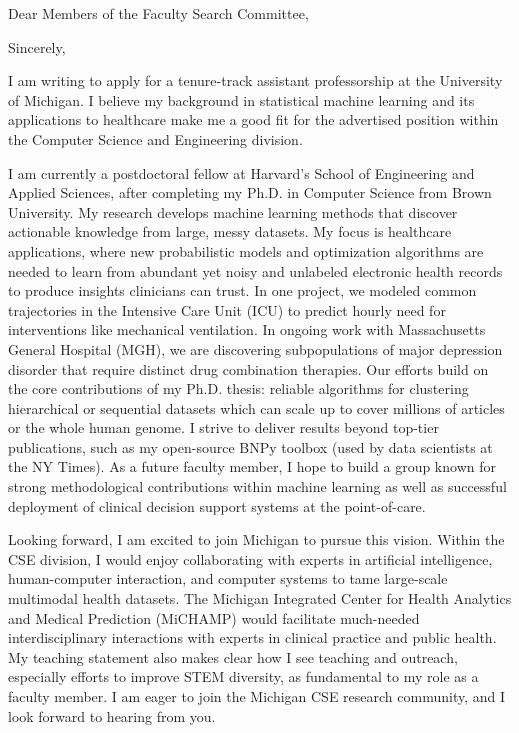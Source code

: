 \documentclass[11pt,letterpaper,roman]{moderncv}        %
\begin{document}
\date{\today}
\opening{Dear Members of the Faculty Search Committee,}
\closing{Sincerely,}

\makelettertitle

I am writing to apply for a tenure-track assistant professorship at the University of Michigan. I believe my background in statistical machine learning and its applications to healthcare make me a good fit for the advertised position within the Computer Science and Engineering division.

I am currently a postdoctoral fellow at Harvard's School of Engineering and Applied Sciences, after completing my Ph.D. in Computer Science from Brown University.
My research develops machine learning methods
that discover actionable knowledge from large, messy datasets. 
My focus is healthcare applications, where new probabilistic models and optimization algorithms are needed to learn from abundant yet noisy and unlabeled electronic health records to produce insights clinicians can trust.
In one project, we modeled common trajectories in the Intensive Care Unit (ICU) to predict hourly need for interventions like mechanical ventilation. In ongoing work with Massachusetts General Hospital (MGH), we are discovering subpopulations of major depression disorder that require distinct drug combination therapies. Our efforts build on the core contributions of my Ph.D. thesis: reliable algorithms for clustering hierarchical or sequential datasets which can scale up to cover millions of articles or the whole human genome.
I strive to deliver results beyond top-tier publications, such as my open-source BNPy toolbox (used by data scientists at the NY Times). As a future faculty member, I hope to build a group known for strong methodological contributions within machine learning as well as successful deployment of clinical decision support systems at the point-of-care.

Looking forward, I am excited to join Michigan to pursue this vision.
Within the CSE division, I would enjoy collaborating with experts in artificial intelligence, human-computer interaction, and computer systems to tame large-scale multimodal health datasets. The 
Michigan Integrated Center for Health Analytics and Medical Prediction (MiCHAMP) would facilitate much-needed interdisciplinary interactions with experts in clinical practice and public health.
My teaching statement also makes clear how I see teaching and outreach, especially efforts to improve STEM diversity, as fundamental to my role as a faculty member.
I am eager to join the Michigan CSE research community, and I look forward to hearing from you.

\makeletterclosing
\end{document}
